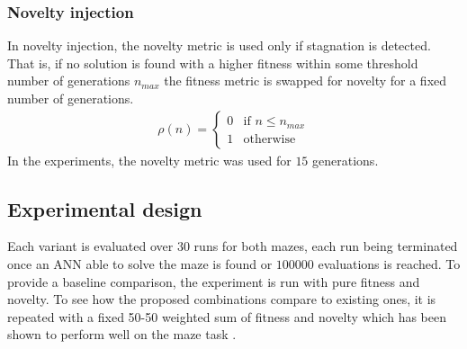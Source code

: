 \subsubsection{Novelty injection}
\label{subsection:injection}
In novelty injection, the novelty metric is used only if stagnation is detected. That is, if no solution is found with a
higher fitness within some threshold number of generations $n_{max}$ the fitness metric is swapped for novelty for a fixed
number of generations.
\begin{align*}
    \rho(n) =
        \begin{cases}
            0 & \text{if $n \leq n_{max}$}\\
            1 & \text{otherwise}
        \end{cases}
\end{align*}
In the experiments, the novelty metric was used for $15$ generations.

\subsection{Experimental design}
\label{subsection:design}
Each variant is evaluated over $30$ runs for both mazes, each run being terminated once an ANN
able to solve the maze is found or $100 000$ evaluations is reached.
To provide a baseline comparison, the experiment is run with pure fitness and novelty. To see how
the proposed combinations compare to existing ones, it is repeated with a fixed 50-50 weighted sum
of fitness and novelty which has been shown to perform well on the maze task \cite{ns_study}.
